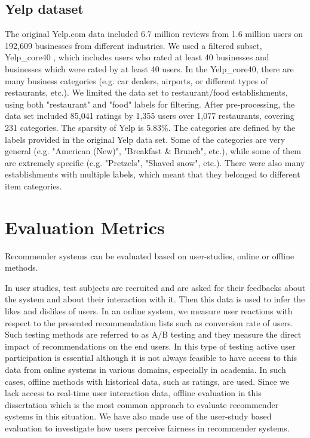     \subsection{Yelp dataset}
    The original Yelp.com data included 6.7 million reviews from 1.6 million users on 192,609 businesses from different industries. We used a filtered subset, Yelp\_core40 \cite{mansoury2019bias}, which includes users who rated at least 40 businesses and businesses which were rated by at least 40 users. In the Yelp\_core40, there are many business categories  (e.g. car dealers, airports, or different types of restaurants, etc.). We limited the data set to restaurant/food establishments, using both "restaurant" and "food" labels for filtering. After pre-processing, the data set included 85,041 ratings by 1,355 users over 1,077 restaurants, covering 231 categories. The sparsity of Yelp is 5.83\%. The categories are defined by the labels provided in the original Yelp data set. Some of the categories are very general (e.g. "American (New)", "Breakfast \& Brunch", etc.), while some of them are extremely specific (e.g. "Pretzels", "Shaved snow", etc.). There were also many establishments with multiple labels, which meant that they belonged to different item categories.



\section{Evaluation Metrics}
\label{sec:eval}
    
    Recommender systems can be evaluated based on user-studies, online or offline methods.
    
    In user studies, test subjects are recruited and are asked for their feedbacks about the system and about their interaction with it. Then this data is used to infer the likes and dislikes of users. 
    In an online system, we measure user reactions with respect to the presented recommendation lists such as conversion rate of users. Such testing methods are referred to as A/B testing and they measure the direct impact of recommendations on the end users. In this type of testing active user participation is essential although it is not always feasible to have access to this data from online systems in various domains, especially in academia. In such cases, offline methods with historical data, such as ratings, are used. Since we lack access to real-time user interaction data, offline evaluation in this dissertation which is the most common approach to evaluate recommender systems in this situation. We have also made use of the user-study based evaluation to investigate  how users perceive fairness in recommender systems.
    
